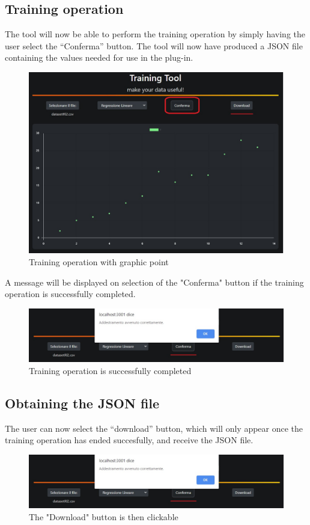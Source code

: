 \subsection{Training operation}
The tool will now be able to perform the training operation by simply  having the user select the “Conferma” button. The tool will now have produced a JSON file containing the values needed for use in the plug-in.
\begin{figure}[H]
\centering
\includegraphics[scale=0.65]{img/tool/confirm.png}
\caption{Training operation with graphic point}
\end{figure}

A message will be displayed on selection of the "Conferma" button if the training operation is successfully completed.
\newline
\begin{figure}[H]
\centering
\includegraphics[scale=0.65]{img/tool/ok_msg.png}
\caption{Training operation is successfully completed}
\end{figure}  

\subsection{Obtaining the JSON file}
The user can now select the “download” button, which will only appear once the training operation has ended succesfully, and receive the JSON file.
\begin{figure}[H]
\centering
\includegraphics[scale=0.65]{img/tool/ok_msg.png}
\caption{The "Download" button is then clickable}
\end{figure} 
